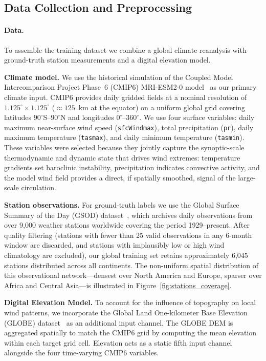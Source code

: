 \documentclass{article}
\begin{document}

\subsection{Data Collection and Preprocessing}
\label{sec:data_collection_preprocessing}

\paragraph{Data.}
To assemble the training dataset we combine a global climate reanalysis with ground-truth station measurements and a digital elevation model.

\textbf{Climate model.} We use the historical simulation of the Coupled Model Intercomparison Project Phase~6 (CMIP6) MRI-ESM2-0 model~\cite{SeijiYukimoto20122012-A02} as our primary climate input. CMIP6 provides daily gridded fields at a nominal resolution of $1.125^\circ \times 1.125^\circ$ ($\approx 125$~km at the equator) on a uniform global grid covering latitudes $90^\circ$S--$90^\circ$N and longitudes $0^\circ$--$360^\circ$. We use four surface variables: daily maximum near-surface wind speed (\texttt{sfcWindmax}), total precipitation (\texttt{pr}), daily maximum temperature (\texttt{tasmax}), and daily minimum temperature (\texttt{tasmin}). These variables were selected because they jointly capture the synoptic-scale thermodynamic and dynamic state that drives wind extremes: temperature gradients set baroclinic instability, precipitation indicates convective activity, and the model wind field provides a direct, if spatially smoothed, signal of the large-scale circulation.

\textbf{Station observations.} For ground-truth labels we use the Global Surface Summary of the Day (GSOD) dataset~\cite{gsod23}, which archives daily observations from over 9{,}000 weather stations worldwide covering the period 1929--present. After quality filtering (stations with fewer than 25 valid observations in any 6-month window are discarded, and stations with implausibly low or high wind climatology are excluded), our global training set retains approximately 6{,}045 stations distributed across all continents. The non-uniform spatial distribution of this observational network---densest over North America and Europe, sparser over Africa and Central Asia---is illustrated in Figure~\ref{fig:stations_coverage}.

\textbf{Digital Elevation Model.} To account for the influence of topography on local wind patterns, we incorporate the Global Land One-kilometer Base Elevation (GLOBE) dataset~\cite{hastings1998development} as an additional input channel. The GLOBE DEM is aggregated spatially to match the CMIP6 grid by computing the mean elevation within each target grid cell. Elevation acts as a static fifth input channel alongside the four time-varying CMIP6 variables.
\end{document}
